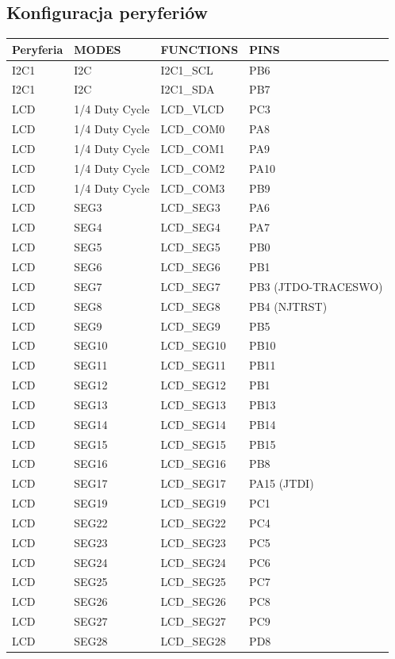 \documentclass[10pt, a4paper]{article}
\begin{document}
\subsection{Konfiguracja peryferiów}

\begin{table}[H]
\centering
\begin{tabular}{|l|l|l|l|}
\hline
Peryferia	&MODES&	FUNCTIONS	&PINS\\ \hline
I2C1&	I2C&	I2C1\_SCL&	PB6\\
I2C1&	I2C&	I2C1\_SDA&	PB7\\
LCD&	1/4 Duty Cycle&	LCD\_VLCD&	PC3\\
LCD&	1/4 Duty Cycle&	LCD\_COM0&	PA8\\
LCD&	1/4 Duty Cycle&	LCD\_COM1&	PA9\\
LCD&	1/4 Duty Cycle&	LCD\_COM2&	PA10\\
LCD&	1/4 Duty Cycle&	LCD\_COM3&	PB9\\
LCD&	SEG3&	LCD\_SEG3&	PA6\\
LCD&	SEG4&	LCD\_SEG4&	PA7\\
LCD&	SEG5&	LCD\_SEG5&	PB0\\
LCD&	SEG6&	LCD\_SEG6&	PB1\\
LCD&	SEG7&	LCD\_SEG7&	PB3 (JTDO-TRACESWO)\\
LCD&	SEG8&	LCD\_SEG8&	PB4 (NJTRST)\\
LCD&	SEG9&	LCD\_SEG9&	PB5\\
LCD&	SEG10&	LCD\_SEG10&	PB10\\
LCD&	SEG11&	LCD\_SEG11&	PB11\\
LCD&	SEG12&	LCD\_SEG12&	PB1\\
LCD&	SEG13&	LCD\_SEG13&	PB13\\
LCD&	SEG14&	LCD\_SEG14&	PB14\\
LCD&	SEG15&	LCD\_SEG15&	PB15\\
LCD&	SEG16&	LCD\_SEG16&	PB8\\
LCD&	SEG17&	LCD\_SEG17&	PA15 (JTDI)\\
LCD&	SEG19&	LCD\_SEG19&	PC1\\
LCD&	SEG22&	LCD\_SEG22&	PC4\\
LCD&	SEG23&	LCD\_SEG23&	PC5\\
LCD&	SEG24&	LCD\_SEG24&	PC6\\
LCD&	SEG25&	LCD\_SEG25&	PC7\\
LCD&	SEG26&	LCD\_SEG26&	PC8\\
LCD&	SEG27&	LCD\_SEG27&	PC9\\
LCD&	SEG28&	LCD\_SEG28&	PD8\\

\end{tabular}
\end{table}
\end{document}

